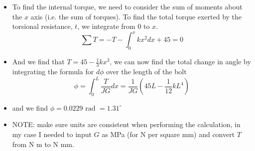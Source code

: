 \documentclass[12pt, oneside]{article}
\begin{document}
\begin{enumerate}
\begin{itemize}
\begin{figure}[H]
				\end{figure}
			\item To find the internal torque, we need to consider the sum of moments about the $x$ axis (i.e. the sum of torques). To find the total torque exerted by the torsional resistance, $t$, we integrate from $0$ to $x$.
				\begin{equation*}
					\sum T = -T - \int_0^x kx^2 dx + 45 = 0
				\end{equation*}
			\item And we find that $T = 45 - \frac{1}{3}kx^3$, we can now find the total change in angle by integrating the formula for $d\phi$ over the length of the bolt
				\begin{equation*}
					\phi = \int_0^L \frac{T}{JG}dx = \frac{1}{JG}\left( 45L - \frac{1}{12}kL^4 \right)
				\end{equation*}
			\item and we find $\phi = 0.0229 \text{ rad } = 1.31^\circ$
			\item NOTE: make sure units are consistent when performing the calculation, in my case I needed to input $G$ as MPa (for N per square mm) and convert $T$ from N m to N mm.
		\end{itemize}


\end{enumerate}
\end{document}
